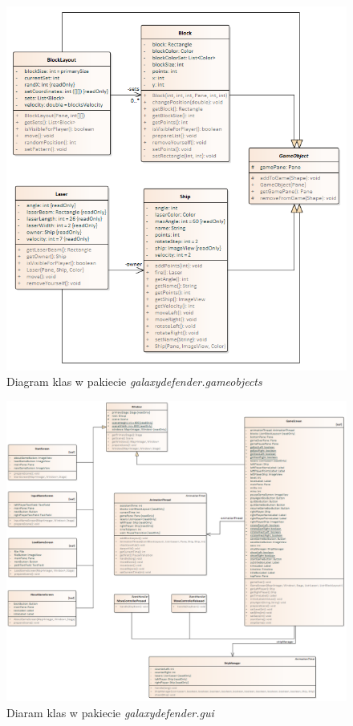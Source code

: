 \documentclass[a4paper]{article}
\begin{document}
\begin{figure}[H]
    \centering
    \includegraphics[width=1\textwidth]{img/pakiet-gameobjects.png}
    \caption{Diagram klas w pakiecie \textit{galaxydefender.gameobjects}}
    \label{fig:pack1}
\end{figure}

\begin{figure}[H]
    \centering
    \includegraphics[width=1\textwidth]{img/pakiet-gui.png}
    \caption{Diaram klas w pakiecie \textit{galaxydefender.gui}}
    \label{fig:pack1}
\end{figure}
\end{document}
